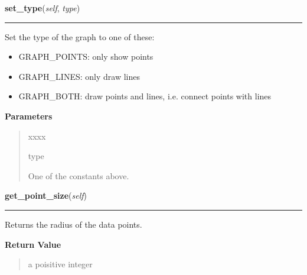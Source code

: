 \hspace{.8\funcindent}\begin{boxedminipage}{\funcwidth}

    \raggedright \textbf{set\_type}(\textit{self}, \textit{type})

    \vspace{-1.5ex}

    \rule{\textwidth}{0.5\fboxrule}
\setlength{\parskip}{2ex}
    Set the type of the graph to one of these:

    \begin{itemize}
    \setlength{\parskip}{0.6ex}
      \item GRAPH\_POINTS: only show points

      \item GRAPH\_LINES: only draw lines

      \item GRAPH\_BOTH: draw points and lines, i.e. connect points with lines

    \end{itemize}

\setlength{\parskip}{1ex}
      \textbf{Parameters}
      \vspace{-1ex}

      \begin{quote}
        \begin{Ventry}{xxxx}

          \item[type]

          One of the constants above.

        \end{Ventry}

      \end{quote}

    \end{boxedminipage}

    \label{pygtk_chart:line_chart:Graph:get_point_size}

    \vspace{0.5ex}

\hspace{.8\funcindent}\begin{boxedminipage}{\funcwidth}

    \raggedright \textbf{get\_point\_size}(\textit{self})

    \vspace{-1.5ex}

    \rule{\textwidth}{0.5\fboxrule}
\setlength{\parskip}{2ex}
    Returns the radius of the data points.

\setlength{\parskip}{1ex}
      \textbf{Return Value}
    \vspace{-1ex}

      \begin{quote}
      a poisitive integer

      \end{quote}

    \end{boxedminipage}

